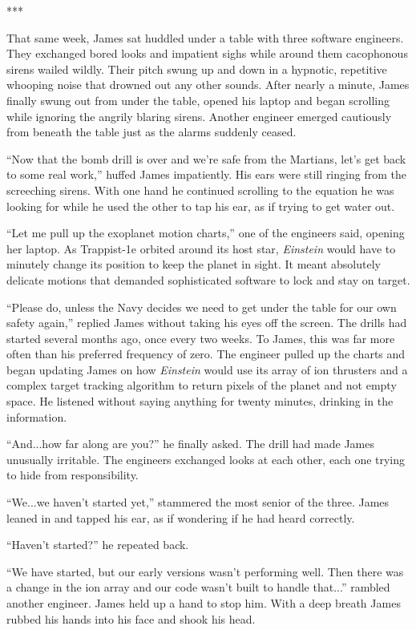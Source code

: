 \documentclass[openany, 12pt]{book} %
\begin{document}
\begin{center}
***
\end{center}

That same week, James sat huddled under a table with three software engineers. They exchanged bored looks and impatient sighs while around them cacophonous sirens wailed wildly. Their pitch swung up and down in a hypnotic, repetitive whooping noise that drowned out any other sounds. After nearly a minute, James finally swung out from under the table, opened his laptop and began scrolling while ignoring the angrily blaring sirens. Another engineer emerged cautiously from beneath the table just as the alarms suddenly ceased.

``Now that the bomb drill is over and we're safe from the Martians, let's get back to some real work,'' huffed James impatiently. His ears were still ringing from the screeching sirens. With one hand he continued scrolling to the equation he was looking for while he used the other to tap his ear, as if trying to get water out.

``Let me pull up the exoplanet motion charts,'' one of the engineers said, opening her laptop. As Trappist-1e orbited around its host star, \textit{Einstein} would have to minutely change its position to keep the planet in sight. It meant absolutely delicate motions that demanded sophisticated software to lock and stay on target.

``Please do, unless the Navy decides we need to get under the table for our own safety again,'' replied James without taking his eyes off the screen. The drills had started several months ago, once every two weeks. To James, this was far more often than his preferred frequency of zero. The engineer pulled up the charts and began updating James on how \textit{Einstein} would use its array of ion thrusters and a complex target tracking algorithm to return pixels of the planet and not empty space. He listened without saying anything for twenty minutes, drinking in the information.

``And...how far along are you?'' he finally asked. The drill had made James unusually irritable. The engineers exchanged looks at each other, each one trying to hide from responsibility.

``We...we haven't started yet,'' stammered the most senior of the three. James leaned in and tapped his ear, as if wondering if he had heard correctly.

``Haven't started?'' he repeated back.

``We have started, but our early versions wasn't performing well. Then there was a change in the ion array and our code wasn't built to handle that...'' rambled another engineer. James held up a hand to stop him. With a deep breath James rubbed his hands into his face and shook his head.
\end{document}
